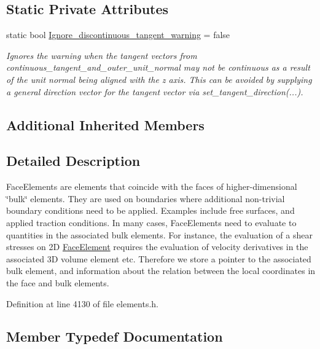 \subsection*{Static Private Attributes}
\begin{DoxyCompactItemize}
\item 
static bool \hyperlink{classoomph_1_1FaceElement_a95ac8141871cfe5353667b64fddee734}{Ignore\+\_\+discontinuous\+\_\+tangent\+\_\+warning} = false
\begin{DoxyCompactList}\small\item\em Ignores the warning when the tangent vectors from continuous\+\_\+tangent\+\_\+and\+\_\+outer\+\_\+unit\+\_\+normal may not be continuous as a result of the unit normal being aligned with the z axis. This can be avoided by supplying a general direction vector for the tangent vector via set\+\_\+tangent\+\_\+direction(...). \end{DoxyCompactList}\end{DoxyCompactItemize}
\subsection*{Additional Inherited Members}


\subsection{Detailed Description}
Face\+Elements are elements that coincide with the faces of higher-\/dimensional \char`\"{}bulk\char`\"{} elements. They are used on boundaries where additional non-\/trivial boundary conditions need to be applied. Examples include free surfaces, and applied traction conditions. In many cases, Face\+Elements need to evaluate to quantities in the associated bulk elements. For instance, the evaluation of a shear stresses on 2D \hyperlink{classoomph_1_1FaceElement}{Face\+Element} requires the evaluation of velocity derivatives in the associated 3D volume element etc. Therefore we store a pointer to the associated bulk element, and information about the relation between the local coordinates in the face and bulk elements. 

Definition at line 4130 of file elements.\+h.



\subsection{Member Typedef Documentation}
\mbox{\label{classoomph_1_1FaceElement_a67356b9329923767ab8f13fed85f7f88}} 
